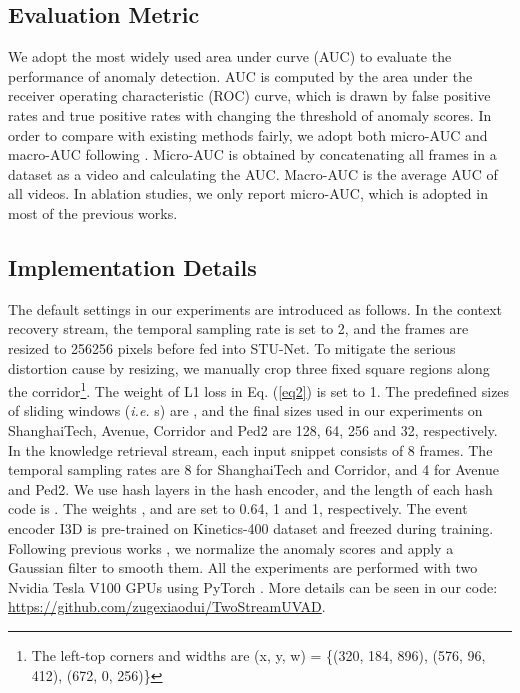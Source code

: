 \documentclass[lettersize,journal]{IEEEtran}
\begin{document}
\subsection{Evaluation Metric}
We adopt the most widely used area under curve (AUC) to evaluate the performance of anomaly detection.
AUC is computed by the area under the receiver operating characteristic (ROC) curve, which is drawn by false positive rates and true positive rates with changing the threshold of anomaly scores.
In order to compare with existing methods fairly, we adopt both micro-AUC and macro-AUC following \cite{BackgroundAgnosticFramework2021georgescua}.
Micro-AUC is obtained by concatenating all frames in a dataset as a video and calculating the AUC.
Macro-AUC is the average AUC of all videos.
In ablation studies, we only report micro-AUC, which is adopted in most of the previous works.

\subsection{Implementation Details}
The default settings in our experiments are introduced as follows.
In the context recovery stream, the temporal sampling rate is set to 2, and the frames are resized to 256256 pixels before fed into STU-Net.
To mitigate the serious distortion cause by resizing, we manually crop three fixed square regions along the corridor\footnote{The left-top corners and widths are (x, y, w) = \{(320, 184, 896), (576, 96, 412), (672, 0, 256)\}}.
The weight of L1 loss  in Eq. (\ref{eq2}) is set to 1.
The predefined sizes of sliding windows (\textit{i.e.} s) are , and the final sizes used in our experiments on ShanghaiTech, Avenue, Corridor and Ped2 are 128, 64, 256 and 32, respectively.
In the knowledge retrieval stream, each input snippet consists of 8 frames.
The temporal sampling rates are 8 for ShanghaiTech and Corridor, and 4 for Avenue and Ped2.
We use  hash layers in the hash encoder, and the length of each hash code  is .
The weights ,  and  are set to 0.64, 1 and 1, respectively.
The event encoder I3D is pre-trained on Kinetics-400 dataset \cite{QuoVadis2017carreira, fan2020pyslowfast} and freezed during training.
Following previous works \cite{FutureFrame2021luo, ObjectCentricAutoEncoders2019ionescua, AnomalyDetection2021georgescua, LearningNormal2021lva, BackgroundAgnosticFramework2021georgescua}, we normalize the anomaly scores and apply a Gaussian filter to smooth them.
All the experiments are performed with two Nvidia Tesla V100 GPUs using PyTorch \cite{AutomaticDifferentiation2017paszke}.
More details can be seen in our code: \url{https://github.com/zugexiaodui/TwoStreamUVAD}.
\end{document}
